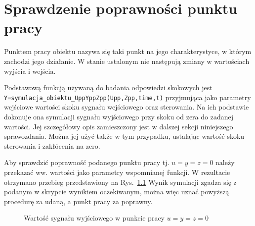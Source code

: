 \chapter{Sprawdzenie poprawności punktu pracy}
Punktem pracy obiektu nazywa się taki punkt na jego charakterystyce, w którym zachodzi jego działanie. W stanie ustalonym nie następują zmiany w wartościach wyjścia i wejścia.

Podstawową funkcją używaną do badania odpowiedzi skokowych jest\\ \verb+Y=symulacja_obiektu_UppYppZpp(Upp,Zpp,time,t)+ przyjmująca jako parametry wejściowe wartości skoku sygnału wejściowego oraz sterowania. Na ich podstawie dokonuje ona symulacji sygnału wyjściowego przy skoku od zera do zadanej wartości. Jej szczegółowy opis zamieszczony jest w dalszej sekcji niniejszego sprawozdania. Można jej użyć także w tym przypadku, ustalając wartość skoku sterowania i zakłócenia na zero.

Aby sprawdzić poprawność podanego punktu pracy tj. $u=y=z=0$ należy przekazać ww. wartości jako parametry wspomnianej funkcji. W rezultacie otrzymano przebieg przedstawiony na Rys.~\ref{ppracy} Wynik symulacji zgadza się z podanym w skrypcie wynikiem oczekiwanym, można więc uznać powyższą procedurę za udaną, a punkt pracy za poprawny.

\begin{figure}
	\centering
	\caption{Wartość sygnału wyjściowego w punkcie pracy $u=y=z=0$}
	
	\label{ppracy}
\end{figure}